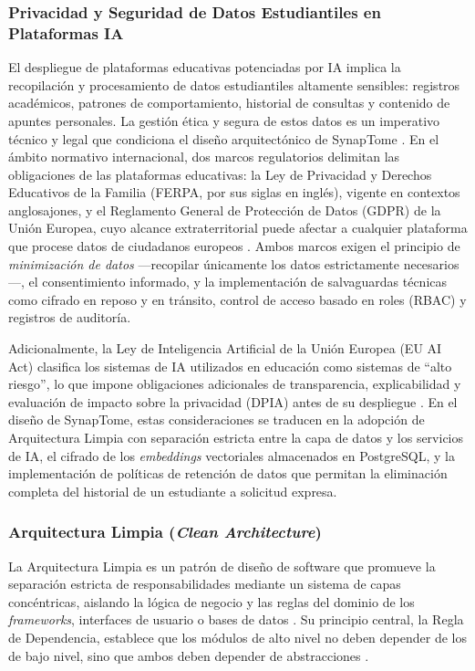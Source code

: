 \subsubsection{Privacidad y Seguridad de Datos Estudiantiles en Plataformas IA}

El despliegue de plataformas educativas potenciadas por IA implica la recopilación y 
procesamiento de datos estudiantiles altamente sensibles: registros académicos, 
patrones de comportamiento, historial de consultas y contenido de apuntes personales. 
La gestión ética y segura de estos datos es un imperativo técnico y legal que condiciona 
el diseño arquitectónico de SynapTome \parencite{XAIEducation2024}. En el ámbito 
normativo internacional, dos marcos regulatorios delimitan las obligaciones de las 
plataformas educativas: la Ley de Privacidad y Derechos Educativos de la Familia 
(FERPA, por sus siglas en inglés), vigente en contextos anglosajones, y el Reglamento 
General de Protección de Datos (GDPR) de la Unión Europea, cuyo alcance extraterritorial 
puede afectar a cualquier plataforma que procese datos de ciudadanos europeos 
\parencite{XAIEducation2024}. Ambos marcos exigen el principio de \textit{minimización 
de datos} —recopilar únicamente los datos estrictamente necesarios—, el consentimiento 
informado, y la implementación de salvaguardas técnicas como cifrado en reposo y en 
tránsito, control de acceso basado en roles (RBAC) y registros de auditoría.

Adicionalmente, la Ley de Inteligencia Artificial de la Unión Europea (EU AI Act) 
clasifica los sistemas de IA utilizados en educación como sistemas de ``alto riesgo'', 
lo que impone obligaciones adicionales de transparencia, explicabilidad y evaluación 
de impacto sobre la privacidad (DPIA) antes de su despliegue \parencite{XAIEducation2024}. 
En el diseño de SynapTome, estas consideraciones se traducen en la adopción de 
Arquitectura Limpia con separación estricta entre la capa de datos y los servicios de 
IA, el cifrado de los \textit{embeddings} vectoriales almacenados en PostgreSQL, y la 
implementación de políticas de retención de datos que permitan la eliminación completa 
del historial de un estudiante a solicitud expresa.

\subsubsection{Arquitectura Limpia (\textit{Clean Architecture})}

La Arquitectura Limpia es un patrón de diseño de software que promueve la separación 
estricta de responsabilidades mediante un sistema de capas concéntricas, aislando la 
lógica de negocio y las reglas del dominio de los \textit{frameworks}, interfaces de 
usuario o bases de datos \textcite{Martin2017}. Su principio central, la Regla de 
Dependencia, establece que los módulos de alto nivel no deben depender de los de bajo 
nivel, sino que ambos deben depender de abstracciones \parencite{Martin2017}.

